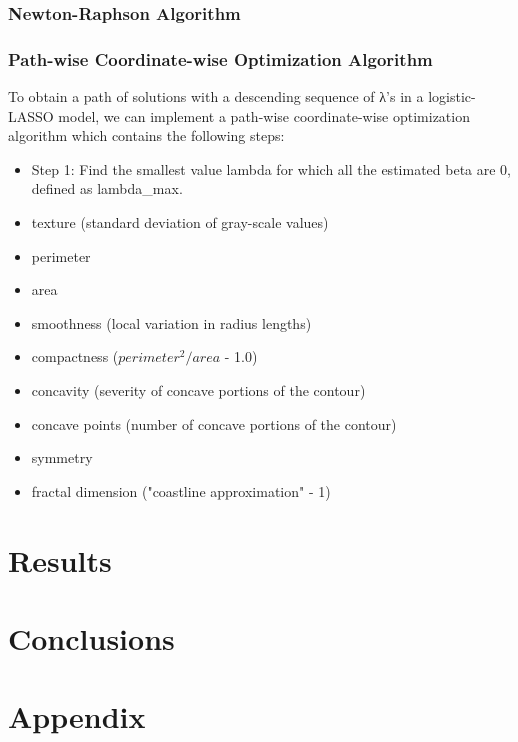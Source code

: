 \documentclass[
]{article}
\begin{document}
\hypertarget{newton-raphson-algorithm}{%
\subsubsection{Newton-Raphson
Algorithm}\label{newton-raphson-algorithm}}

\hypertarget{path-wise-coordinate-wise-optimization-algorithm}{%
\subsubsection{Path-wise Coordinate-wise Optimization
Algorithm}\label{path-wise-coordinate-wise-optimization-algorithm}}

To obtain a path of solutions with a descending sequence of λ's in a
logistic-LASSO model, we can implement a path-wise coordinate-wise
optimization algorithm which contains the following steps:

\begin{itemize}
\item Step 1: Find the smallest value lambda for which all the estimated beta are 0, defined as lambda_max.
\item texture (standard deviation of gray-scale values)
\item perimeter
\item area
\item smoothness (local variation in radius lengths)
\item compactness ($perimeter^2/area$ - 1.0)
\item concavity (severity of concave portions of the contour)
\item concave points (number of concave portions of the contour)
\item symmetry
\item fractal dimension ("coastline approximation" - 1)
\end{itemize}

\hypertarget{results}{%
\section{Results}\label{results}}

\hypertarget{conclusions}{%
\section{Conclusions}\label{conclusions}}

\hypertarget{appendix}{%
\section{Appendix}\label{appendix}}
\end{document}
